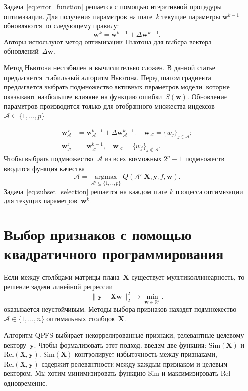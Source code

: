 \documentclass[a4paper,12pt]{article}
\theoremstyle{plain} %
\theoremstyle{definition} %
\theoremstyle{remark} %
\newcommand{\bw}{\mathbf{w}}
\newcommand{\by}{\mathbf{y}}
\newcommand{\cA}{\mathcal{A}}
\newcommand{\bbR}{\mathbb{R}}
\newcommand{\bX}{\mathbf{X}}
\newcommand{\argmax}{\mathop{\arg \max}\limits}
\begin{document}
	Задача~\eqref{eq:error_function} решается с помощью итеративной процедуры оптимизации. 
	Для получения параметров на шаге~$k$ текущие параметры $\bw^{k-1}$ обновляются по следующему правилу:
	\begin{equation}
	\bw^k = \bw^{k - 1} + \Delta \bw^{k - 1}.
	\label{eq:update_rule}
	\end{equation}
	Авторы используют метод оптимизации Ньютона для выбора вектора обновлений~$\Delta \bw$.
	
	Метод Ньютона нестабилен и вычислительно сложен. 
	В данной статье предлагается стабильный алгоритм Ньютона. 
	Перед шагом градиента предлагается выбрать подмножество активных параметров модели, которые оказывают наибольшее влияние на функцию ошибки~$S (\bw)$.
	Обновление параметров производится только для отобранного множества индексов~$\cA \subseteq \{ 1, \dots, p \}$
	
	\begin{align*}
	\bw_{\cA}^k &= \bw_{\cA}^{k - 1} + \Delta \bw_{\cA}^{k - 1}, \quad \bw_{\cA} = \{w_j\}_{j \in \cA}; \\
	\bw_{\bar{\cA}}^k &= \bw_{\bar{\cA}}^{k - 1}, \quad \bw_{\bar{\cA}} = \{w_j\}_{j \notin \cA}.
	\end{align*}
	Чтобы выбрать подмножество~$\cA$ из всех возможных $2^p - 1$~подмножеств, вводится функция качества
	\begin{equation}
	\cA = \argmax_{\cA' \subseteq \{1, \dots, p\}} Q(\cA' | \bX, \by, f, \bw).
	\label{eq:subset_selection}
	\end{equation}
	Задача~\eqref{eq:subset_selection} решается на каждом шаге $k$ процесса оптимизации для текущих параметров~$\bw^k$.
	
	\section*{Выбор признаков с помощью квадратичного программирования}
	Если между столбцами матрицы плана~$\bX$ существует мультиколлинеарность, то решение задачи линейной регрессии
	\begin{equation}
	\| \by - \bX \bw\|_2^2 \rightarrow\min_{\bw \in \bbR^{n}}.
	\label{eq:linear_regression}
	\end{equation}
	оказывается неустойчивым. 
	Методы выбора признаков находят подмножество~$ \cA \in \{1, \dots, n\}$ оптимальных столбцов~$\bX$. 
	
	Алгоритм QPFS выбирает некоррелированные признаки, релевантные целевому вектору~$\by$.
	Чтобы формализовать этот подход, введем две функции: $\text{Sim}(\bX)$ и $\text{Rel}(\bX, \by)$. 
	$\text{Sim}(\bX)$ контролирует избыточность между признаками, $\text{Rel}(\bX, \by)$ содержит релевантности между каждым признаком и целевым вектором. 
	Мы хотим минимизировать функцию Sim и максимизировать Rel одновременно.
	
\end{document}
